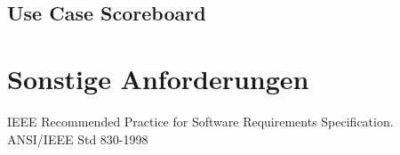\documentclass[a4paper, twosided, 11pt]{scrartcl}
\begin{document}
\subsection{Use Case Scoreboard}

\section{Sonstige Anforderungen}

\renewcommand{\refname}{Referenzen}
\begin{thebibliography}{2}
    IEEE Recommended Practice for Software Requirements Specification. ANSI/IEEE Std 830-1998
\end{thebibliography}
\end{document}
